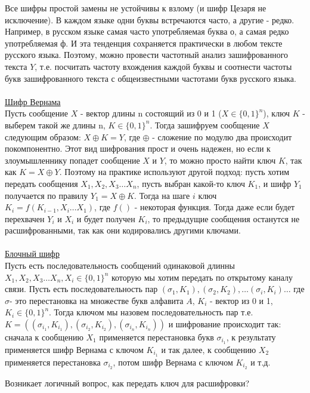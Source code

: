 Все шифры простой замены не устойчивы к взлому (и шифр Цезаря не исключение). В каждом языке одни буквы встречаются часто, а другие - редко. Например, в русском языке самая часто употребляемая буква о, а самая редко употребляемая ф. И эта тенденция сохраняется практически в любом тексте русского языка. Поэтому, можно провести частотный анализ зашифрованного текста $Y$, т.е. посчитать частоту вхождения каждой буквы и соотнести частоты букв зашифрованного текста с общеизвестными частотами букв русского языка.\\
\\
\href{https://clck.ru/TQFhp}{Шифр Вернама} \\
Пусть сообщение $X$ - вектор длины n состоящий из 0 и 1 ($X \in \{0, 1\}^n$), ключ $K$ - выберем такой же длины n, $K \in \{0, 1\}^n$. Тогда зашифруем сообщение $X$ следующим образом: $X \oplus K = Y$, где $\oplus$ - сложение по модулю два происходит покомпонентно. Этот вид шифрования прост и очень надежен, но если к злоумышленнику попадет сообщение $X$ и $Y$, то можно просто найти ключ $K$, так как $K = X \oplus Y$. Поэтому на практике используют другой подход: пусть хотим передать сообщения $X_1, X_2, X_3 \dots X_n$, пусть выбран какой-то ключ $K_1$, и шифр $Y_1$ получается по правилу $Y_1 = X \oplus K$. Тогда на шаге $i$ ключ $K_i = f (K_{i - 1}, X_i \dots X_1)$, где $f()$ - некоторая функция. Тогда даже если будет перехвачен $Y_i$ и $X_i$ и будет получен $K_i$, то предыдущие сообщения останутся не расшифрованными, так как они кодировались другими ключами. \\
\\
\href{https://clck.ru/UNdXg}{Блочный шифр} \\
Пусть есть последовательность сообщений одинаковой длинны $X_1, X_2, X_3 \dots X_n, X_i \in \{0, 1\}^n$ которую мы хотим передать по открытому каналу связи. Пусть есть последовательность пар $(\sigma_1, K_1), (\sigma_2, K_2), \dots (\sigma_i, K_i) \dots$ где $\sigma$- это перестановка на множестве букв алфавита $A$, $K_i$ - вектор из 0 и 1, $K_i \in \{0, 1\}^n$. Тогда ключом мы назовем последовательность пар т.е. $K = ((\sigma_{i_1}, K_{i_1}), (\sigma_{i_2}, K_{i_2}), (\sigma_{i_n}, K_{i_n}))$ и шифрование происходит так: сначала к сообщению $X_1$ применяется перестановка букв $\sigma_{i_1}$, к результату применяется шифр Вернама с ключом $K_{i_1}$ и так далее, к сообщению $X_2$ применяется перестановка $\sigma_{i_2}$, потом шифр Вернама с ключом $K_{i_2}$ и т.д.

Возникает логичный вопрос, как передать ключ для расшифровки? \\


